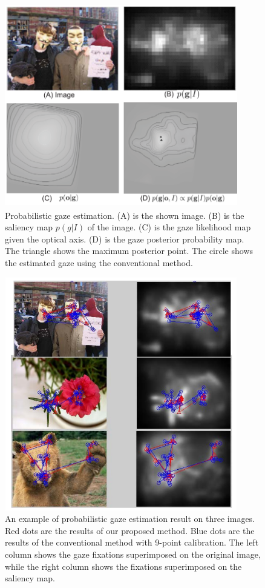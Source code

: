 \begin{figure}[!hbt]
  \centering
  \includegraphics[width=4in,height=3.5in]{jixu.png}
  \caption{Probabilistic gaze estimation. (A) is the shown image. (B) is the saliency map $p(g|I)$ of the image. (C) is the gaze likelihood map given the optical axis. (D) is the gaze posterior probability map. The triangle shows the maximum posterior point. The circle shows the estimated gaze using the conventional method.}
  \label{jixu}
\end{figure}


\begin{figure}[!hbt]
  \centering
  \includegraphics[width=4in,height=4in]{jixu2.png}
  \caption{An example of probabilistic gaze estimation result on three images. Red dots are the results of our proposed method. Blue dots are the results of the conventional method with 9-point calibration. The left column shows the gaze fixations superimposed on the original image, while the right column shows the fixations superimposed on the saliency map.}
  \label{jix2}
\end{figure}

